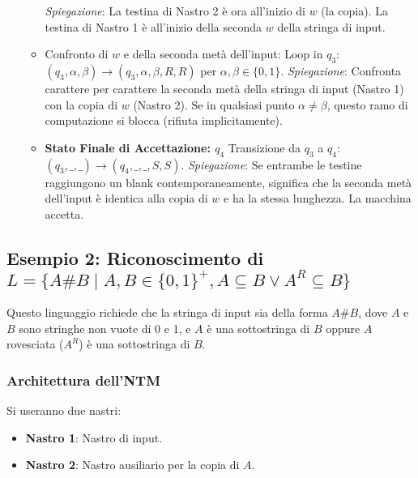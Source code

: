 \documentclass[a4paper]{article}
\begin{document}
\begin{itemize}
\begin{itemize}
                \textit{Spiegazione}: La testina di Nastro 2 è ora all'inizio di $w$ (la copia). La testina di Nastro 1 è all'inizio della seconda $w$ della stringa di input.
            \item Confronto di $w$ e della seconda metà dell'input: Loop in $q_3$:
                $(q_3, \alpha, \beta) \to (q_3, \alpha, \beta, R, R)$ per $\alpha, \beta \in \{0, 1\}$.
                \textit{Spiegazione}: Confronta carattere per carattere la seconda metà della stringa di input (Nastro 1) con la copia di $w$ (Nastro 2). Se in qualsiasi punto $\alpha \neq \beta$, questo ramo di computazione si blocca (rifiuta implicitamente).
            \item \textbf{Stato Finale di Accettazione: $q_4$}
                Transizione da $q_3$ a $q_4$:
                $(q_3, \text{\_}, \text{\_}) \to (q_4, \text{\_}, \text{\_}, S, S)$.
                \textit{Spiegazione}: Se entrambe le testine raggiungono un blank contemporaneamente, significa che la seconda metà dell'input è identica alla copia di $w$ e ha la stessa lunghezza. La macchina accetta.
        \end{itemize}
\end{itemize}

\subsection{Esempio 2: Riconoscimento di $L = \{A\#B \mid A,B \in \{0,1\}^+, A \subseteq B \lor A^R \subseteq B \}$}
Questo linguaggio richiede che la stringa di input sia della forma $A\#B$, dove $A$ e $B$ sono stringhe non vuote di 0 e 1, e $A$ è una sottostringa di $B$ oppure $A$ rovesciata ($A^R$) è una sottostringa di $B$.

\subsubsection{Architettura dell'NTM}
Si useranno due nastri:
\begin{itemize}
    \item \textbf{Nastro 1}: Nastro di input.
    \item \textbf{Nastro 2}: Nastro ausiliario per la copia di $A$.
\end{itemize}
\end{document}
